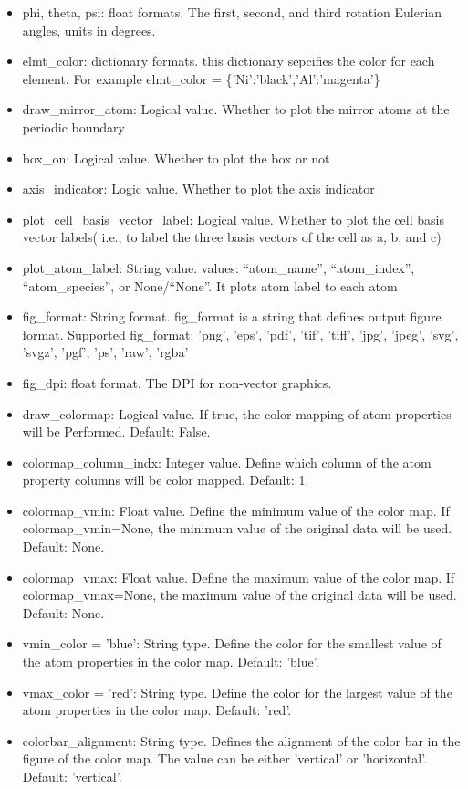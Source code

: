 \documentclass[12pt]{book}
\begin{document}
\begin{itemize}
\item phi, theta, psi: float formats. The first, second, and third rotation Eulerian angles, units in degrees.
\item elmt\_color: dictionary formats. this dictionary sepcifies the color for each element. For example elmt\_color = \{'Ni':'black','Al':'magenta'\}
\item draw\_mirror\_atom: Logical value. Whether to plot the mirror atoms at the periodic boundary
\item box\_on: Logical value. Whether to plot the box or not
\item axis\_indicator: Logic value. Whether to plot the axis indicator
\item plot\_cell\_basis\_vector\_label: Logical value. Whether to plot the cell basis vector labels( i.e., to label the three basis vectors of the cell as a, b, and c)
\item plot\_atom\_label: String value. values: ``atom\_name'', ``atom\_index'', ``atom\_species'', or None/``None''. It plots atom label to each atom
\item fig\_format: String format. fig\_format is a string that defines output figure format. Supported fig\_format: 'png', 'eps', 'pdf', 'tif', 'tiff', 'jpg', 'jpeg', 'svg', 'svgz', 'pgf', 'ps', 'raw', 'rgba'
\item fig\_dpi: float format. The DPI for non-vector graphics.
\item draw\_colormap: Logical value. If true, the color mapping of atom properties will be Performed. Default: False.
\item colormap\_column\_indx: Integer value. Define which column of the atom property columns will be color mapped. Default: 1.
\item colormap\_vmin: Float value. Define the minimum value of the color map. If colormap\_vmin=None, the minimum value of the original data will be used. Default: None.
\item colormap\_vmax: Float value. Define the maximum value of the color map. If colormap\_vmax=None, the maximum value of the original data will be used. Default: None.
\item vmin\_color = 'blue': String type. Define the color for the smallest value of the atom properties in the color map. Default: 'blue'.
\item vmax\_color = 'red': String type. Define the color for the largest value of the atom properties in the color map. Default: 'red'.
\item colorbar\_alignment: String type. Defines the alignment of the color bar in the figure of the color map. The value can be either 'vertical' or 'horizontal'. Default: 'vertical'.
\end{itemize}
\end{document}
